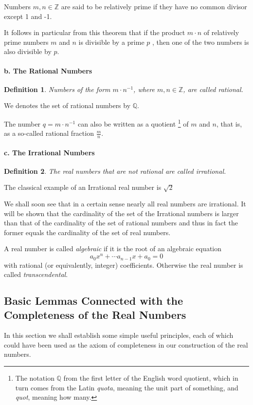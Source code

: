 \documentclass[a4paper,12pt]{article} %
\newtheorem{definition}{Definition}[section]
\begin{document}
Numbers $m,n\in \mathbb{Z}$ are said to be relatively prime if they 
have no common divisor except 1 and -1.

It follows in particular from this theorem that if the product $m\cdot n$
of relatively prime numbers $m$ and $n$ is divisible by a prime $p$ ,
then one of the two numbers is also divisible by $p$.

\paragraph{b. The Rational Numbers}
\begin{definition}
    Numbers of the form $m\cdot n^{-1}$, where $m,n\in \mathbb{Z}$, are called 
    rational.
\end{definition}

We denotes the set of rational numbers by $\mathbb{Q}$.

The number $q=m\cdot n^{-1}$ can also be written as a quotient 
\footnote{The notation $\mathbb{Q}$ from the first letter of the English 
word quotient, which in turn comes from the Latin \textit{quota}, meaning 
the unit part of something, and \textit{quot}, meaning how many.} 
of $m$ and $n$, that is, as a so-called rational fraction $\displaystyle \frac{m}{n}.$
\paragraph{c. The Irrational Numbers}
\begin{definition}
    The real numbers that are not rational are called irrational.
\end{definition}

The classical example of an Irrational real number is $\sqrt{2}$

We shall soon see that in a certain sense nearly all real numbers 
are irrational. It will be shown that the cardinality of the set 
of the Irrational numbers is larger than that of the cardinality 
of the set of rational numbers and thus in fact the former equals
the cardinality of the set of real numbers.

A real number is called \textit{algebraic} if it is the root of an algebraic 
equation \[a_0 x^n+\cdots a_{n-1}x+a_0=0\]
with rational (or equivalently, integer) coefficients. Otherwise the 
real number is called \textit{transcendental}.

\subsection{Basic Lemmas Connected with the Completeness of the Real Numbers}
In this section we shall establish some simple useful principles, each of 
which could have been used as the axiom of completeness in our construction
of the real numbers.
\end{document}
